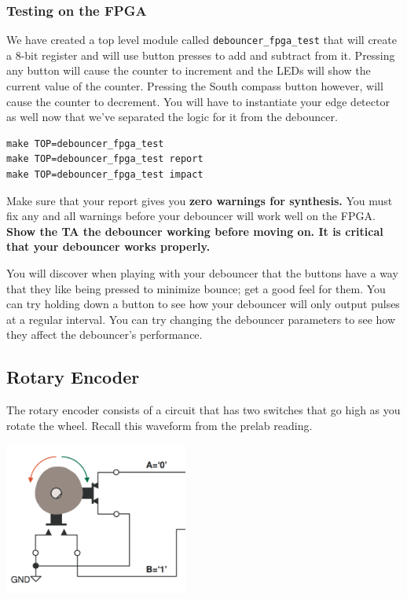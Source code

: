 \documentclass[11pt]{article}
\begin{document}
\subsubsection{Testing on the FPGA}
We have created a top level module called \verb|debouncer_fpga_test| that will create a 8-bit register and will use button presses to add and subtract from it. Pressing any button will cause the counter to increment and the LEDs will show the current value of the counter. Pressing the South compass button however, will cause the counter to decrement. You will have to instantiate your edge detector as well now that we've separated the logic for it from the debouncer.

\begin{verbatim}
make TOP=debouncer_fpga_test
make TOP=debouncer_fpga_test report
make TOP=debouncer_fpga_test impact
\end{verbatim} 

Make sure that your report gives you \textbf{zero warnings for synthesis.} You must fix any and all warnings before your debouncer will work well on the FPGA.\\

\textbf{Show the TA the debouncer working before moving on. It is critical that your debouncer works properly.}

You will discover when playing with your debouncer that the buttons have a way that they like being pressed to minimize bounce; get a good feel for them. You can try holding down a button to see how your debouncer will only output pulses at a regular interval. You can try changing the debouncer parameters to see how they affect the debouncer's performance.

\subsection{Rotary Encoder}

The rotary encoder consists of a circuit that has two switches that go high as you rotate the wheel. Recall this waveform from the prelab reading.

\begin{center}
\includegraphics[height=5cm]{images/lab2_fig5.png}
\end{center}
\end{document}
